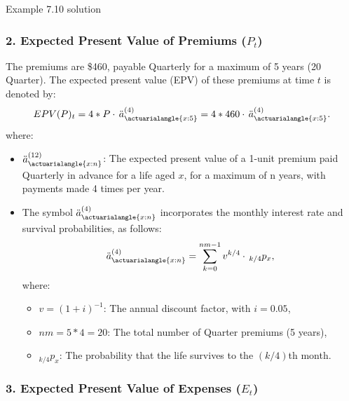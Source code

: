\begin{solve}{}{Example 7.10 solution}
		\subsubsection*{2. Expected Present Value of Premiums (\(P_t\))}
		
		The premiums are \$460, payable Quarterly for a maximum of 5 years (20 Quarter). The expected present value (EPV) of these premiums at time \(t\) is denoted by:
		\[
		EPV(P)_t = 4 * P \cdot \, \ddot{a}_{\actuarialangle{x:5}}^{(4)} = 4 * 460 \cdot \, \ddot{a}_{\actuarialangle{x:5}}^{(4)}.
		\]
		where:
		\begin{itemize}
			\item \(\ddot{a}_{\actuarialangle{x:n}}^{(12)}\): The expected present value of a 1-unit premium paid Quarterly in advance for a life aged \(x\), for a maximum of n years, with payments made 4 times per year.
			\item The symbol \(\ddot{a}_{\actuarialangle{x:n}}^{(4)}\) incorporates the monthly interest rate and survival probabilities, as follows:
			\[
			\ddot{a}_{\actuarialangle{x:n}}^{(4)} = \sum_{k=0}^{nm-1} v^{k/4} \cdot \, _{k/4}p_x,
			\]
			where:
			\begin{itemize}
				\item \(v = (1+i)^{-1}\): The annual discount factor, with \(i = 0.05\),
				\item \(nm = 5*4 = 20\): The total number of Quarter premiums (5 years),
				\item \(_{k/4}p_x\): The probability that the life survives to the \((k/4)\)th month.
			\end{itemize}
		\end{itemize}
		
		\subsubsection*{3. Expected Present Value of Expenses (\(E_t\))}
		

\end{solve}
